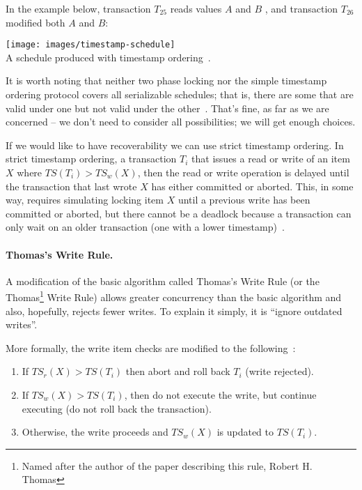 In the example below, transaction $T_{25}$ reads values $A$ and $B$ , and transaction $T_{26}$ modified both $A$ and $B$:

\begin{center}
	\texttt{[image: images/timestamp-schedule]}\\
	A schedule produced with timestamp ordering~\cite{dsc}.
\end{center}

It is worth noting that neither two phase locking nor the simple timestamp ordering protocol covers all serializable schedules; that is, there are some that are valid under one but not valid under the other~\cite{fds}. That's fine, as far as we are concerned -- we don't need to consider all possibilities; we will get enough choices.

If we would like to have recoverability we can use strict timestamp ordering. In strict timestamp ordering, a transaction $T_{i}$ that issues a read or write of an item $X$ where $T\!S(T_{i}) > T\!S_{w}(X)$, then the read or write operation is delayed until the transaction that last wrote $X$ has either committed or aborted. This, in some way, requires simulating locking item $X$ until a previous write has been committed or aborted, but there cannot be a deadlock because a transaction can only wait on an older transaction (one with a  lower timestamp)~\cite{fds}.

\paragraph{Thomas's Write Rule.} A modification of the basic algorithm called Thomas's Write Rule (or the Thomas\footnote{Named after the author of the paper describing this rule, Robert H. Thomas} Write Rule) allows greater concurrency than the basic algorithm and also, hopefully, rejects fewer writes. To explain it simply, it is ``ignore outdated writes''.

More formally, the write item checks are modified to the following~\cite{fds}:
\begin{enumerate}
	\item If $T\!S_{r}(X) > T\!S(T_{i})$ then abort and roll back $T_{i}$ (write rejected).
	\item If $T\!S_{w}(X) > T\!S(T_{i})$, then do not execute the write, but continue executing (do not roll back the transaction).
	\item Otherwise, the write proceeds and $T\!S_{w}(X)$ is updated to $T\!S(T_{i})$. 
\end{enumerate}

